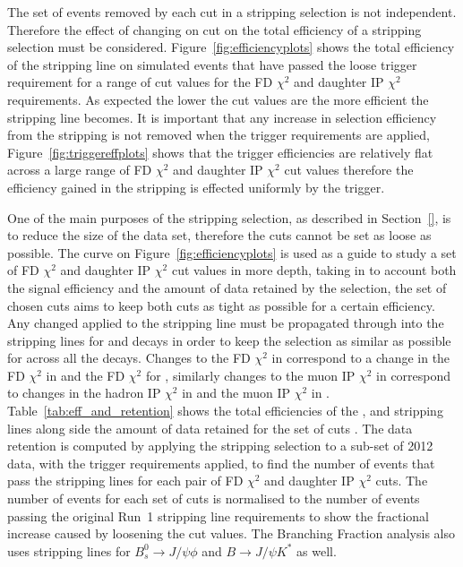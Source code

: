 The set of events removed by each cut in a stripping selection is not independent. Therefore the effect of changing on cut on the total efficiency of a stripping selection must be considered. Figure~\ref{fig:efficiencyplots} shows the total efficiency of the \bsmumu stripping line on simulated \bsmumu events that have passed the loose trigger requirement for a range of cut values for the FD $\chi^{2}$ and daughter IP $\chi^{2}$ requirements. As expected the lower the cut values are the more efficient the stripping line becomes. It is important that any increase in \bsmumu selection efficiency from the stripping is not removed when the trigger requirements are applied, Figure~\ref{fig:triggereffplots} shows that the trigger efficiencies are relatively flat across a large range of FD $\chi^{2}$ and daughter IP $\chi^{2}$ cut values therefore the efficiency gained in the stripping is effected uniformly by the trigger. 

One of the main purposes of the stripping selection, as described in Section~\ref{}, is to reduce the size of the data set, therefore the cuts cannot be set as loose as possible. The curve on Figure~\ref{fig:efficiencyplots} is used as a guide to study a set of FD $\chi^{2}$ and daughter IP $\chi^{2}$ cut values in more depth, taking in to account both the signal efficiency and the amount of data retained by the selection, the set of chosen cuts aims to keep both cuts as tight as possible for a certain efficiency. Any changed applied to the \bmumu stripping line must be propagated through into the stripping lines for \bhh and \bujpsik decays in order to keep the selection as similar as possible for across all the decays. Changes to the \bsd FD $\chi^{2}$ in \bsmumu correspond to a change in the \bsd FD $\chi^{2}$ in \bhh and the \jpsi FD $\chi^{2}$ for \bujpsik, similarly changes to the muon IP $\chi^{2}$ in \bsmumu correspond to changes in the hadron IP $\chi^{2}$ in \bhh and the muon IP $\chi^{2}$ in \bujpsik. Table~\ref{tab:eff_and_retention} shows the total efficiencies of the \bmumu, \bhh and \bujpsik stripping lines along side the amount of data retained for the set of cuts . The data retention is computed by applying the stripping selection to a sub-set of 2012 data, with the trigger requirements applied, to find the number of events that pass the stripping lines for each pair of FD $\chi^{2}$ and daughter IP $\chi^{2}$ cuts. The number of events for each set of cuts is normalised to the number of events passing the original Run~1 stripping line requirements  to show the fractional increase caused by loosening the cut values. The \bmumu Branching Fraction analysis also uses stripping lines for $B^{0}_{s} \to J/\psi \phi$ and $B \to J/\psi K^{*}$ as well. 

